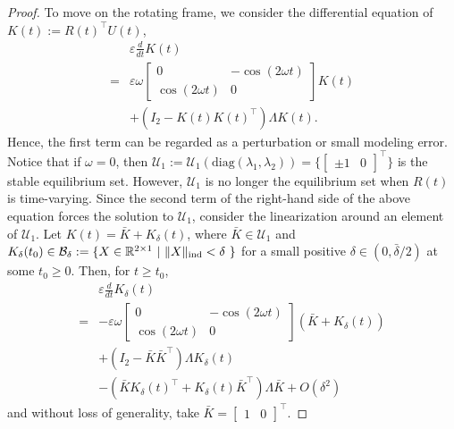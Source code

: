 \documentclass[fleqn,10pt]{SICE_FES26}
\begin{document}
    \begin{proof}
    To move on the rotating frame, we consider the differential equation of $K(t) := R(t) ^{\top} U(t)$, 
    \begin{align*}
    &\varepsilon \frac{d}{dt} K(t) 
    \\
    =&
    \varepsilon \omega 
    \begin{bmatrix}
    0 & - \cos (2\omega t) \\ \cos (2\omega t) & 0
    \end{bmatrix} K(t)
    \\
    &
    +
    (I_{2} - K(t) K(t)^{\top}) \Lambda K(t)
    .
    \end{align*}
    Hence, the first term can be regarded as a perturbation or small modeling error. 
    Notice that if $\omega =0 $, then ${\mathcal{U}}_{1} := {\mathcal{U}}_{1}({\mathrm{diag}}(\lambda_{1}, \lambda _{2})) = \{ \begin{bmatrix} \pm 1 & 0 \end{bmatrix} ^{\top} \}$ is the stable equilibrium set. 
    However, ${\mathcal{U}}_{1}$ is no longer the equilibrium set when $R(t)$ is time-varying. 
    Since the second term of the right-hand side of the above equation forces the solution to ${\mathcal{U}}_{1}$, consider the linearization around an element of ${\mathcal{U}}_{1}$. 
    Let $K(t) = \bar{K} + K_{\delta}(t)$, where $\bar{K} \in {\mathcal{U}}_{1}$ and $K_{\delta}(t_{0}) \in {\mathcal{B}}_{\delta} := \{ X \in {\mathbb{R}}^{2\times 1} \ | \ \| X \| _{\rm ind} < \delta \ \}$ for a small positive $\delta \in (0, \bar{\delta} /2)$ at some $t_{0}\geq 0$. 
    Then, for $t\geq t_{0}$, 
    \begin{align*}
    & \varepsilon \frac{d}{dt} K_{\delta}(t) 
    \\
    =&
    -\varepsilon \omega \begin{bmatrix}
    0 & - \cos (2\omega t) \\ \cos (2\omega t) & 0
    \end{bmatrix} ( \bar{K} + K_{\delta}(t) )
    \\
    & +
    ( I_{2} - \bar{K} \bar{K}^{\top} ) \Lambda K_{\delta}(t)
    \\
    &
    -
    (\bar{K} K_{\delta} (t)^{\top} + K_{\delta}(t) \bar{K}^{\top} ) \Lambda \bar{K}
    + O (\delta ^2) 
    \end{align*}
    and without loss of generality, take $\bar{K} = \begin{bmatrix} 1 & 0 \end{bmatrix} ^{\top}$.  

\end{proof}
\end{document}
